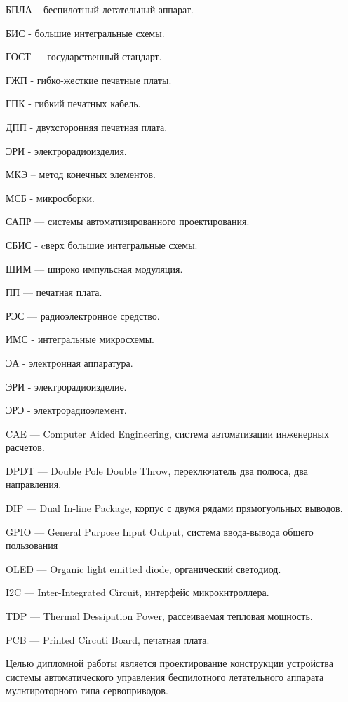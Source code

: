 \tableofcontents
\newpage




БПЛА – беспилотный летательный аппарат.

БИС - большие интегральные схемы.

ГОСТ — государственный стандарт.

ГЖП - гибко-жесткие печатные платы.

ГПК - гибкий печатных кабель.

ДПП - двухсторонняя печатная плата.

ЭРИ - электрорадиоизделия.

МКЭ – метод конечных элементов.

МСБ - микросборки.

САПР — системы автоматизированного проектирования.

СБИС - cверх большие интегральные схемы.

ШИМ — широко импульсная модуляция.

ПП — печатная плата.

РЭС — радиоэлектронное средство.

ИМС - интегральные микросхемы.

ЭА - электронная аппаратура.

ЭРИ - электрорадиоизделие.

ЭРЭ - электрорадиоэлемент.

CAE — Computer Aided Engineering, система автоматизации инженерных расчетов.

DPDT — Double Pole Double Throw, переключатель два полюса, два направления.

DIP — Dual In-line Package, корпус с двумя рядами
прямогуольных выводов.

GPIO — General Purpose Input Output, система ввода-вывода общего пользования

OLED — Organic light emitted diode, органический светодиод.

I2C — Inter-Integrated Circuit, интерфейс микрокнтроллера.

TDP — Thermal Dessipation Power, рассеиваемая тепловая мощность.

PCB — Printed Circuti Board, печатная плата.

\newpage


Целью дипломной работы является проектирование конструкции
устройства системы автоматического управления
беспилотного летательного аппарата мультироторного типа сервоприводов.

